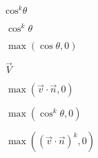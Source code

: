 \documentclass{article}
\begin{document}
$ \mbox{cos}^k \theta $
\pagebreak

$ \cos^k \theta $
\pagebreak

$\max(\cos \theta,0)$
\pagebreak

$\vec{V}$
\pagebreak

$\max(\vec{v} \cdot \vec{n}, 0)$
\pagebreak

$\max(\cos^k \theta,0)$
\pagebreak

$\max((\vec{v} \cdot \vec{n})^k, 0)$
\pagebreak
\end{document}
